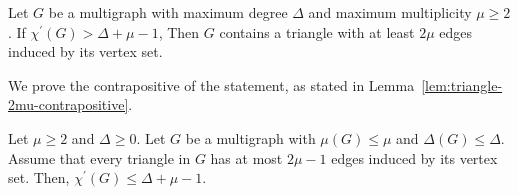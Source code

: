 \begin{proposition}
    Let \(G\) be a multigraph with maximum degree \(\Delta\) and maximum multiplicity \(\mu \geq 2\).
    If \(\chi^{\prime}(G) > \Delta + \mu - 1\),
    Then \(G\) contains a triangle with at least \(2\mu\) edges induced by its vertex set.
\end{proposition}

We prove the contrapositive of the statement, as stated in Lemma~\ref{lem:triangle-2mu-contrapositive}.

\begin{lemma} \label{lem:triangle-2mu-contrapositive}
    Let \(\mu \geq 2\) and \(\Delta \geq 0\).
    Let \(G\) be a multigraph with \(\mu(G) \leq \mu\) and \(\Delta(G) \leq \Delta\).
    Assume that every triangle in \(G\) has at most \(2\mu - 1\) edges induced by its vertex set.
    Then, \(\chi^{\prime}(G) \leq \Delta + \mu - 1\).
\end{lemma}

